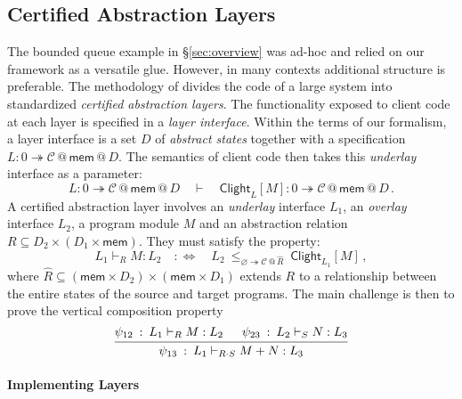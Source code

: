 \documentclass[acmsmall,screen,review,nonacm]{acmart}
\newcommand{\kw}[1]{\ensuremath{ \mathsf{#1} }}
\newcommand{\emptysig}{0}
\begin{document}

\subsection{Certified Abstraction Layers} \label{sec:application:cal} %

The bounded queue example in \S\ref{sec:overview} was ad-hoc
and relied on our framework as a versatile glue.
However, in many contexts additional structure is preferable.
The methodology of \citet{popl15}
divides the code of a large system into standardized
\emph{certified abstraction layers}.
The functionality exposed to client code at each layer
is specified in a \emph{layer interface}.
Within the terms of our formalism,
a layer interface is
a set $D$ of \emph{abstract states}
together with a specification
$L : \emptysig \twoheadrightarrow \mathcal{C} \mathbin@ \kw{mem} \mathbin@ D$.
The semantics of client code then takes
this \emph{underlay} interface as a parameter:
\begin{equation} \label{eqn:layersem}
  L :
    \emptysig \twoheadrightarrow
    \mathcal{C} \mathbin@ \kw{mem} \mathbin@ D
  \quad \vdash \quad
  \kw{Clight}_L[M] :
    \emptysig \twoheadrightarrow
    \mathcal{C} \mathbin@ \kw{mem} \mathbin@ D
  \,.
\end{equation}
A certified abstraction layer
involves an \emph{underlay} interface $L_1$,
an \emph{overlay} interface $L_2$,
a program module $M$
and an abstraction relation $R \subseteq D_2 \times (D_1 \times \kw{mem})$.
They must satisfy the property:
\[
  L_1 \vdash_R M : L_2
  \quad :\Leftrightarrow \quad
  L_2 \: \le_{\varnothing \twoheadrightarrow \mathcal{C} \mathbin@ \hat{R}} \:
    \kw{Clight}_{L_1}[M]
  \,,
\]
where
$\hat{R} \subseteq (\kw{mem} \times D_2) \times (\kw{mem} \times D_1)$
extends $R$ to a relationship between
the entire states of the source and target programs.
The main challenge is then to prove the vertical composition property
\begin{equation} \label{eqn:calvcomp}
  \begin{prooftree}
    \hypo{\psi_{12} \: : \: L_1 \vdash_R M : L_2}
    \hypo{\psi_{23} \: : \: L_2 \vdash_S N : L_3}
    \infer2{\psi_{13} \: : \: L_1 \vdash_{R \cdot S} M + N : L_3}
  \end{prooftree}
\end{equation}

\paragraph{Implementing Layers}
\end{document}
